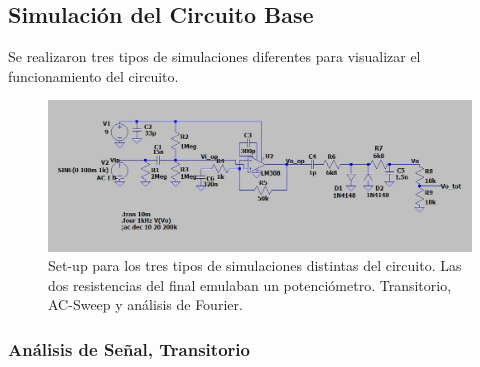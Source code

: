 \subsection{Simulación del Circuito Base}

Se realizaron tres tipos de simulaciones diferentes para visualizar el funcionamiento del circuito.

\begin{figure}[H]
	\centering
	\includegraphics[width=1\textwidth, trim={0 0 0 0}, clip]{Ejercicio5/Imagenes/Circuito_base/Sim/sim_base.JPG}
	\caption{Set-up para los tres tipos de simulaciones distintas del circuito. Las dos resistencias del final emulaban un potenciómetro. Transitorio, AC-Sweep y análisis de Fourier.}
	\label{fig:sim_base}
\end{figure}

\subsubsection{Análisis de Señal, Transitorio}

